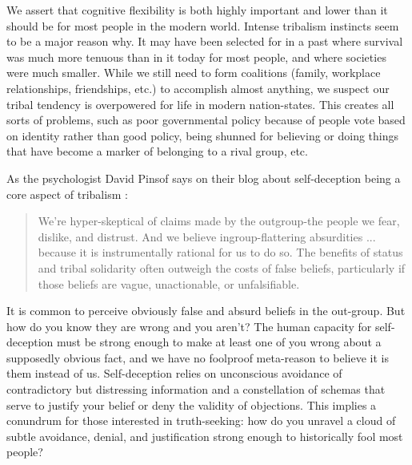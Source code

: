 \documentclass[12pt,letterpaper]{book}
\begin{document}
We assert that cognitive flexibility is both highly important and lower than it should be for most people in the modern world. Intense tribalism instincts seem to be a major reason why. It may have been selected for in a past where survival was much more tenuous than in it today for most people, and where societies were much smaller. While we still need to form coalitions (family, workplace relationships, friendships, etc.) to accomplish almost anything, we suspect our tribal tendency is overpowered for life in modern nation-states. This creates all sorts of problems, such as poor governmental policy because of people vote based on identity \cite{klein2020Polarized} rather than good policy, being shunned for believing or doing things that have become a marker of belonging to a rival group, etc.

As the psychologist David Pinsof says on their blog about self-deception being a core aspect of tribalism \cite{pinsof2024Truth}:
\begin{quotation}
	We're hyper-skeptical of claims made by the outgroup-the people we fear, dislike, and distrust. And we believe ingroup-flattering absurdities ... because it is instrumentally rational for us to do so. The benefits of status and tribal solidarity often outweigh the costs of false beliefs, particularly if those beliefs are vague, unactionable, or unfalsifiable.
\end{quotation}

It is common to perceive obviously false and absurd beliefs in the out-group. But how do you know they are wrong and you aren't? The human capacity for self-deception must be strong enough to make at least one of you wrong about a supposedly obvious fact, and we have no foolproof meta-reason to believe it is them instead of us. Self-deception relies on unconscious avoidance of contradictory but distressing information and a constellation of schemas that serve to justify your belief or deny the validity of objections. This implies a conundrum for those interested in truth-seeking: how do you unravel a cloud of subtle avoidance, denial, and justification strong enough to historically fool most people?
\end{document}
